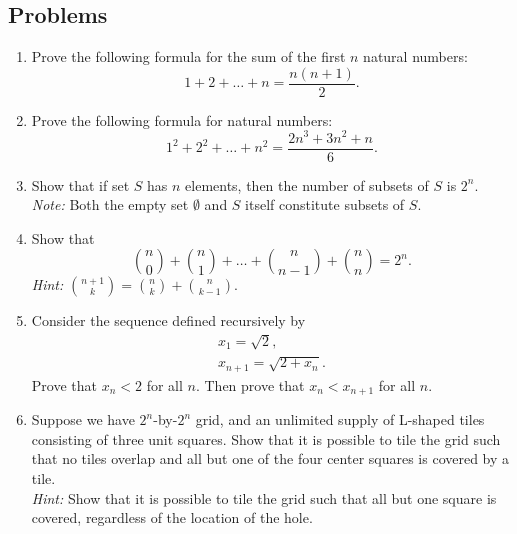 \documentclass{article}
\begin{document}

\noindent
{}

\subsection*{Problems}

\begin{enumerate}
\item Prove the following formula for the sum of the first $n$ natural numbers:
\begin{equation*}
1 + 2 + \ldots + n = \frac{n(n + 1)}{2}.
\end{equation*}

\item Prove the following formula for natural numbers:
\begin{equation*}
1^2 + 2^2 + \ldots + n^2 = \frac{2n^3 + 3n^2 + n}{6}.
\end{equation*}

\item Show that if set $S$ has $n$ elements, then the number of subsets of $S$ is $2^n$.\\
\textit{Note:} Both the empty set $\emptyset$ and $S$ itself constitute subsets of $S$.

\item Show that
\begin{equation*}
{n \choose 0} + {n \choose 1} + \ldots + {n \choose n - 1} + {n \choose n} = 2^n.
\end{equation*}
\textit{Hint:} ${n + 1 \choose k} = {n \choose k} + {n \choose k - 1}.$

\item Consider the sequence defined recursively by
\begin{gather*}
x_1 = \sqrt{2},\\
x_{n + 1} = \sqrt{2 + x_n}.
\end{gather*}
Prove that $x_n < 2$ for all $n$. Then prove that $x_n < x_{n + 1}$ for all $n$.

\item Suppose we have $2^n$-by-$2^n$ grid, and an unlimited supply of L-shaped tiles consisting of three unit squares. Show that it is possible to tile the grid such that no tiles overlap and all but one of the four center squares is covered by a tile.\\
\textit{Hint:} Show that it is possible to tile the grid such that all but one square is covered, regardless of the location of the hole.


\end{enumerate}
\end{document}
